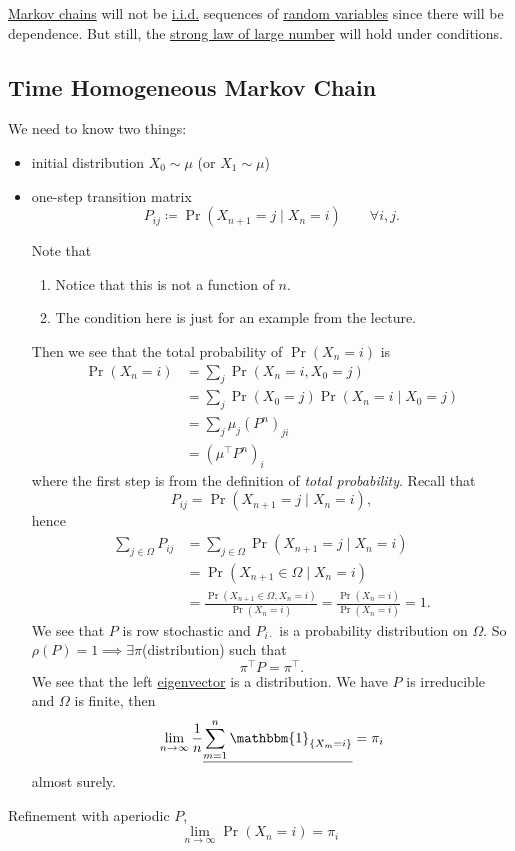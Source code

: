 \begin{note}
	\hyperref[def:Markov-chain]{Markov chains} will not be \hyperref[def:i.i.d.]{i.i.d.} sequences of \hyperref[def:random-variable]{random variables}
	since there will be dependence. But still, the \hyperref[thm:SLLN]{strong law of large number} will hold under conditions.
\end{note}

\subsection{Time Homogeneous Markov Chain}
We need to know two things:
\begin{itemize}
	\item initial distribution \(X_0 \sim \mu\) (or \(X_1\sim \mu\))
	\item one-step transition matrix
	      \[
		      P_{ij} \coloneqq \Pr(X_{n+1} = j \mid X_n = i)\qquad \forall i, j.
	      \]


	      \begin{note}
		      Note that
		      \begin{enumerate}
			      \item Notice that this is not a function of \(n\).
			      \item The condition here is just for an example from the lecture.
		      \end{enumerate}
	      \end{note}

	      Then we see that the total probability of \(\Pr(X_n = i)\) is
	      \[
		      \begin{split}
			      \Pr(X_n = i) &= \sum_j \Pr(X_n = i, X_0 = j)\\
			      &= \sum_j \Pr(X_0 = j)\Pr(X_n = i  \mid  X_0 = j)\\
			      &=\sum_j \mu_{j} (P^n)_{ji}\\
			      &= (\mu^{\top} P^n)_i
		      \end{split}
	      \]
	      where the first step is from the definition of \emph{total probability}. Recall that
	      \[
		      P_{ij} = \Pr(X_{n+1} = j \mid X_n = i),
	      \]
	      hence
	      \[
		      \begin{split}
			      \sum_{j\in \Omega} P_{ij} &= \sum_{j\in \Omega} \Pr(X_{n+1} = j \mid X_n = i)\\
			      &= \Pr(X_{n+1}\in \Omega \mid X_n = i)\\
			      &= \frac{\Pr(X_{n+1}\in \Omega, X_n = i)}{\Pr(X_n = i)}
			      = \frac{\Pr(X_n = i)}{\Pr(X_n = i)}
			      = 1.
		      \end{split}
	      \]
	      We see that \(P\) is row stochastic and \(P_{i\cdot}\) is a probability distribution on \(\Omega\). So \(\rho(P) = 1\implies \exists  \pi\)(distribution) such that
	      \[
		      \pi^{\top} P = \pi^{\top}.
	      \]
	      We see that the left \hyperref[def:eigenvector]{eigenvector} is a distribution. We have \(P\) is irreducible and \(\Omega\) is finite, then
	      \[
		      \lim_{n\to \infty } \frac{1}{n}\underline{\sum\limits_{m=1}^{n}  \mathbbm{1}_{\left\{ X_m = i \right\} }} = \pi_i
	      \]
	      almost surely.
\end{itemize}

Refinement with aperiodic \(P\),
\[
	\lim_{n\to \infty }\Pr(X_n = i) = \pi_i
\]